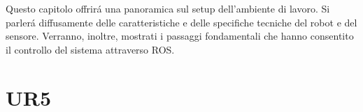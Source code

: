 Questo capitolo offrir\'{a} una panoramica sul setup dell'ambiente di lavoro. 
Si parler\'{a} diffusamente delle caratteristiche e delle specifiche tecniche del robot e del sensore. Verranno, inoltre, 
mostrati i passaggi fondamentali che hanno consentito il controllo del sistema attraverso ROS.

\section{UR5}

